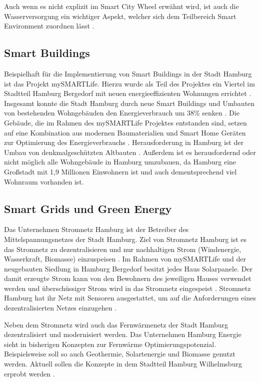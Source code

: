 Auch wenn es nicht explizit im Smart City Wheel erwähnt wird, ist auch die Wasserversorgung ein wichtiger Aspekt, welcher sich dem Teilbereich Smart Environment zuordnen lässt \autocite[vgl.][]{Dickey.2018}.

\subsection{Smart Buildings}
Beispielhaft für die Implementierung von Smart Buildings in der Stadt Hamburg ist das Projekt mySMARTLife.
Hierzu wurde als Teil des Projektes ein Viertel im Stadtteil Hamburg Bergedorf mit neuen energieeffizienten Wohnungen errichtet \autocite[vgl.][S. 2ff.]{Hamburg.OD}.
Insgesamt konnte die Stadt Hamburg durch neue Smart Buildings und Umbauten von bestehenden Wohngebäuden den Energieverbrauch um 38\% senken \autocite[vgl.][]{Hamburg.ODB}.
Die Gebäude, die im Rahmen des mySMARTLife Projektes entstanden sind, setzen auf eine Kombination aus modernen Baumaterialien und Smart Home Geräten zur Optimierung des Energieverbrauchs \autocite[vgl.][S. 2ff.]{Hamburg.OD}.
Herausforderung in Hamburg ist der Umbau von denkmalgeschützten Altbauten \autocite[vgl.][]{Hamburg.ODA}.
Außerdem ist es herausfordernd oder nicht möglich alle Wohngebäude in Hamburg umzubauen, da Hamburg eine Großstadt mit 1,9 Millionen Einwohnern ist und auch dementsprechend viel Wohnraum vorhanden ist.


\subsection{Smart Grids und Green Energy}
Das Unternehmen Stromnetz Hamburg ist der Betreiber des Mittelspannungsnetzes der Stadt Hamburg.
Ziel von Stromnetz Hamburg ist es das Stromnetz zu dezentralisieren und nur nachhaltigen Strom (Windenergie, Wasserkraft, Biomasse) einzuspeisen \autocite[vgl.][]{StromnetzHamburg.OD}.
Im Rahmen von mySMARTLife und der neugebauten Siedlung in Hamburg Bergedorf besitzt jedes Haus Solarpanele.
Der damit erzeugte Strom kann von den Bewohnern des jeweiligen Hauses verwendet werden und überschüssiger Strom wird in das Stromnetz eingespeist \autocite[vgl.][S. 9]{Hamburg.OD}.
Stromnetz Hamburg hat ihr Netz mit Sensoren ausgestattet, um auf die Anforderungen eines dezentralisierten Netzes einzugehen \autocite[vgl.][]{StromnetzHamburg.OD}.

Neben dem Stromnetz wird auch das Fernwärmenetz der Stadt Hamburg dezentralisiert und modernisiert werden.
Das Unternehmen Hamburg Energie sieht in bisherigen Konzepten zur Fernwärme Optimierungspotenzial.
Beispielsweise soll so auch Geothermie, Solartenergie und Biomasse genutzt werden.
Aktuell sollen die Konzepte in dem Stadtteil Hamburg Wilhelmsburg erprobt werden \autocite[][]{HamburgEnergie.OD}.

